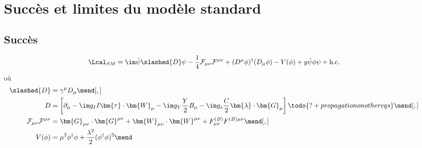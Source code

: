 \section{Succès et limites du modèle standard}\label{chapter-MS-MSSM-section-succes_limites}
\subsection{Succès}\label{chapter-MS-MSSM-section-succes_limites-subsec-succes}

\begin{equation}
\Lcal_{SM} = 
\im \bar{\psi} \slashed{D} \psi
- \frac{1}{4} \mathcal{F}_{\mu\nu}\mathcal{F}^{\mu\nu}
+ (D^\mu\phi)^\dagger(D_\mu\phi) - V(\phi)
+ y \bar{\psi}\phi\psi + \text{h.c.}
\end{equation}
où
\begin{align}
\slashed{D} &= \gamma^\mu D_\mu
\mend[,]\\
D &= \left[ \partial_\mu - \im g_I I \bm{\tau}\cdot\bm{W}_\mu - \im g_Y \frac{Y}{2} B_\mu - \im g_s \frac{C}{2} \bm{\lambda}\cdot\bm{G}_\mu \right]
\todo{?+propagation on other eqs}
\mend[,]\\
\mathcal{F}_{\mu\nu}\mathcal{F}^{\mu\nu} &= \bm{G}_{\mu\nu} \cdot \bm{G}^{\mu\nu} + \bm{W}_{\mu\nu} \cdot \bm{W}^{\mu\nu} + F^{(B)}_{\mu\nu} F^{(B)\mu\nu}
\mend[,]\\
V(\phi) &= \mu^2\phi^\dagger\phi + \frac{\lambda^2}{2} (\phi^\dagger\phi)^2
\mend
\end{align}

